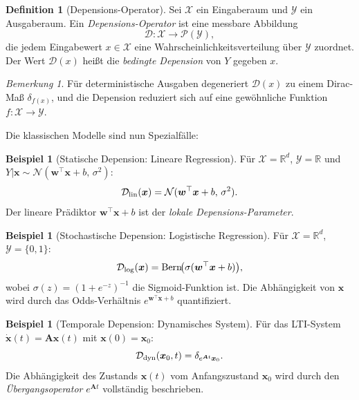 ﻿\documentclass[12pt, a4paper]{article}
\theoremstyle{definition}
\newtheorem{definition}[theorem]{Definition}
\newtheorem{example}[theorem]{Beispiel}
\theoremstyle{remark}
\newtheorem{remark}[theorem]{Bemerkung}
\newcommand{\R}{\mathbb{R}}
\newcommand{\sigmoid}{\sigma}
\newcommand{\vw}{\bm{w}}
\newcommand{\vx}{\bm{x}}
\newcommand{\vA}{\bm{A}}
\newcommand{\T}{\top}
\begin{document}
\begin{definition}[Depensions-Operator]
\label{def:depop}
Sei $\mathcal{X}$ ein Eingaberaum und $\mathcal{Y}$ ein Ausgaberaum. Ein
\emph{Depensions-Operator} ist eine messbare Abbildung
\begin{equation}
  \mathcal{D} : \mathcal{X} \to \mathcal{P}(\mathcal{Y}),
  \label{eq:depop}
\end{equation}
die jedem Eingabewert $x \in \mathcal{X}$ eine Wahrscheinlichkeitsverteilung über
$\mathcal{Y}$ zuordnet. Der Wert $\mathcal{D}(x)$ heißt die
\emph{bedingte Depension} von $Y$ gegeben $x$.
\end{definition}

\begin{remark}
Für deterministische Ausgaben degeneriert $\mathcal{D}(x)$ zu einem Dirac-Maß
$\delta_{f(x)}$, und die Depension reduziert sich auf eine gewöhnliche Funktion
$f: \mathcal{X} \to \mathcal{Y}$.
\end{remark}

Die klassischen Modelle sind nun Spezialfälle:

\begin{example}[Statische Depension: Lineare Regression]
  Für $\mathcal{X} = \R^d$, $\mathcal{Y} = \R$ und $Y|\vx \sim \mathcal{N}(\vw^\T\vx + b,\,\sigma^2)$:
  \[
    \mathcal{D}_{\rm lin}(\vx) = \mathcal{N}(\vw^\T\vx + b,\,\sigma^2).
  \]
  Der lineare Prädiktor $\vw^\T\vx + b$ ist der \emph{lokale Depensions-Parameter}.
\end{example}

\begin{example}[Stochastische Depension: Logistische Regression]
\label{ex:logdep}
  Für $\mathcal{X} = \R^d$, $\mathcal{Y} = \{0,1\}$:
  \[
    \mathcal{D}_{\rm log}(\vx) = \mathrm{Bern}\!\bigl(\sigmoid(\vw^\T\vx + b)\bigr),
  \]
  wobei $\sigmoid(z) = (1+e^{-z})^{-1}$ die Sigmoid-Funktion ist. Die Abhängigkeit
  von $\vx$ wird durch das Odds-Verhältnis $e^{\vw^\T\vx+b}$ quantifiziert.
\end{example}

\begin{example}[Temporale Depension: Dynamisches System]
\label{ex:tempdep}
  Für das LTI-System $\dot{\vx}(t) = \vA\vx(t)$ mit $\vx(0) = \vx_0$:
  \[
    \mathcal{D}_{\rm dyn}(\vx_0, t) = \delta_{e^{\vA t}\vx_0}.
  \]
  Die Abhängigkeit des Zustands $\vx(t)$ vom Anfangszustand $\vx_0$ wird durch den
  \emph{Übergangsoperator} $e^{\vA t}$ vollständig beschrieben.
\end{example}
\end{document}
